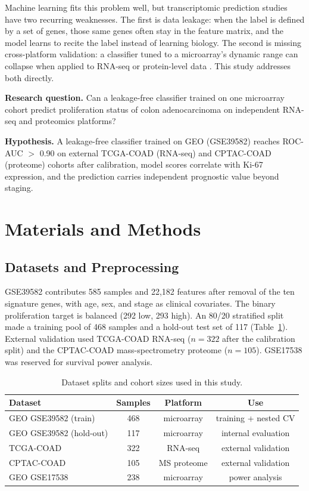 \documentclass[11pt]{article}
\begin{document}
Machine learning fits this problem well, but transcriptomic prediction studies have two recurring weaknesses. The first is data leakage: when the label is defined by a set of genes, those same genes often stay in the feature matrix, and the model learns to recite the label instead of learning biology. The second is missing cross-platform validation: a classifier tuned to a microarray's dynamic range can collapse when applied to RNA-seq or protein-level data \cite{vanclaster2019}. This study addresses both directly.

\textbf{Research question.} Can a leakage-free classifier trained on one microarray cohort predict proliferation status of colon adenocarcinoma on independent RNA-seq and proteomics platforms?

\textbf{Hypothesis.} A leakage-free classifier trained on GEO (GSE39582) reaches ROC-AUC $>$ 0.90 on external TCGA-COAD (RNA-seq) and CPTAC-COAD (proteome) cohorts after calibration, model scores correlate with Ki-67 expression, and the prediction carries independent prognostic value beyond staging.

\section{Materials and Methods}

\subsection{Datasets and Preprocessing}
GSE39582 \cite{marisa2013} contributes 585 samples and 22,182 features after removal of the ten signature genes, with age, sex, and stage as clinical covariates. The binary proliferation target is balanced (292 low, 293 high). An 80/20 stratified split made a training pool of 468 samples and a hold-out test set of 117 (Table~\ref{tab:data}). External validation used TCGA-COAD RNA-seq \cite{tcga2012} ($n=322$ after the calibration split) and the CPTAC-COAD mass-spectrometry proteome \cite{vasikar2019} ($n=105$). GSE17538 \cite{smith2010} was reserved for survival power analysis.

\begin{table}[htbp]
\centering
\caption{Dataset splits and cohort sizes used in this study.}
\label{tab:data}
\begin{tabular}{lccc}
\toprule
\textbf{Dataset} & \textbf{Samples} & \textbf{Platform} & \textbf{Use} \\
\midrule
GEO GSE39582 (train) & 468 & microarray & training + nested CV \\
GEO GSE39582 (hold-out) & 117 & microarray & internal evaluation \\
TCGA-COAD & 322 & RNA-seq & external validation \\
CPTAC-COAD & 105 & MS proteome & external validation \\
GEO GSE17538 & 238 & microarray & power analysis \\
\bottomrule
\end{tabular}
\end{table}
\end{document}
